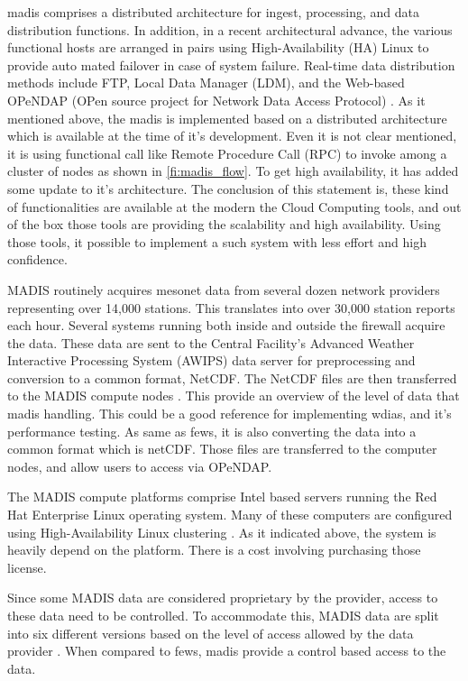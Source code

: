 \acrshort{madis} comprises a distributed architecture for ingest, processing, and data distribution functions.
In addition, in a recent architectural advance, the various functional hosts are arranged in pairs using High-Availability (HA) Linux to provide auto mated failover in case of system failure. Real-time data distribution methods include FTP, Local Data Manager (LDM), and the Web-based OPeNDAP (OPen source project for Network Data Access Protocol) \cite{Macdermaid2005ARCHITECTUREP2.39}. As it mentioned above, the \acrshort{madis} is implemented based on a distributed architecture which is available at the time of it's development. Even it is not clear mentioned, it is using functional call like Remote Procedure Call (RPC) to invoke among a cluster of nodes as shown in \cref{fi:madis_flow}. To get high availability, it has added some update to it's architecture. The conclusion of this statement is, these kind of functionalities are available at the modern the Cloud Computing tools, and out of the box those tools are providing the scalability and high availability. Using those tools, it possible to implement a such system with less effort and high confidence.

MADIS routinely acquires mesonet data from several dozen network providers representing over 14,000 stations. This translates into over 30,000 station reports each hour. Several systems running both inside and outside the firewall acquire the data. These data are sent to the Central Facility's Advanced Weather Interactive Processing System (AWIPS) data server for preprocessing and conversion to a common format, NetCDF. The NetCDF files are then transferred to the MADIS compute nodes \cite{Macdermaid2005ARCHITECTUREP2.39}. This provide an overview of the level of data that \acrshort{madis} handling. This could be a good reference for implementing \acrshort{wdias}, and it's performance testing. As same as \acrshort{fews}, it is also converting the data into a common format which is \acrshort{netCDF}. Those files are transferred to the computer nodes, and allow users to access via OPeNDAP.

The MADIS compute platforms comprise Intel based servers running the Red Hat Enterprise Linux operating system. Many of these computers are configured using High-Availability Linux clustering \cite{Macdermaid2005ARCHITECTUREP2.39}. As it indicated above, the system is heavily depend on the platform. There is a cost involving purchasing those license.

Since some MADIS data are considered proprietary by the provider, access to these data need to be controlled. To accommodate this, MADIS data are split into six different versions based on the level of access allowed by the data provider \cite{Macdermaid2005ARCHITECTUREP2.39}. When compared to \acrshort{fews}, \acrshort{madis} provide a control based access to the data.



